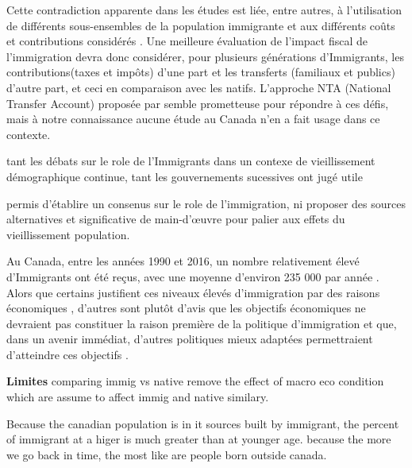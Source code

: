 Cette contradiction apparente dans les études est liée, entre autres, à l'utilisation de différents sous-ensembles de la population immigrante \citep{grubelFiscalTransfersImmigrants2012} et aux différents coûts et contributions considérés \citep{dAlbis:2019de}. Une meilleure évaluation de l'impact fiscal de l'immigration devra donc considérer, pour plusieurs générations d'Immigrants, les contributions(taxes et impôts) d'une part et les transferts (familiaux et publics) d'autre part, et ceci en comparaison avec les natifs. L'approche NTA (National Transfer Account) proposée par \citet{Mason:2011wc} semble prometteuse pour répondre à ces défis, mais à notre connaissance aucune étude au Canada n'en a fait usage dans ce contexte.

tant les débats sur le role de l'Immigrants dans un contexe de vieillissement démographique continue, tant les gouvernements sucessives ont jugé utile




permis d'établire un consenus sur le role de l'immigration, ni proposer des sources alternatives et significative de main-d’œuvre pour palier aux effets du vieillissement population.



 Au Canada, entre  les années 1990 et 2016, un nombre relativement élevé d’Immigrants ont été reçus, avec une moyenne d’environ 235 000 par année \citep{StatistiqueCanada:2016ud}. Alors que certains justifient ces niveaux élevés d’immigration par des raisons économiques \citep{Christine:2015tu,Newton:1981jy}, d’autres sont plutôt d’avis que les objectifs économiques ne devraient pas constituer la raison première de la politique d’immigration et que, dans un avenir immédiat, d’autres politiques mieux adaptées permettraient d’atteindre ces objectifs \citep{Gingras:2000dk,Green:1999ko,McDaniel:2013kf,Wong:2015uz}.



\textbf{Limites}
comparing immig vs native remove the effect of macro eco condition which are assume to affect immig and native similary.


Because the canadian population is in it sources built by immigrant, the percent of immigrant at a higer is much greater than at younger age. because the more we go back in time, the most like are people born outside canada.




